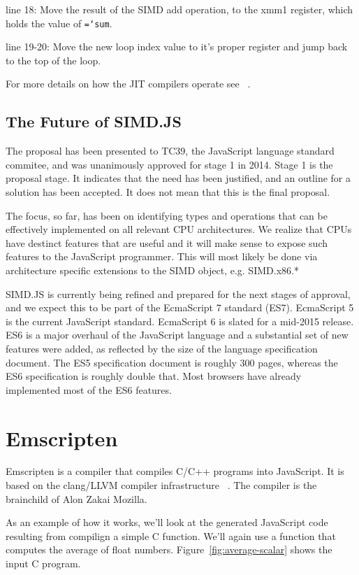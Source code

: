 \documentclass[preprint]{sigplanconf}
\newcommand{\ttt}[1]{{\texttt{\hyphenchar\font=`\-\relax #1}}}%
\begin{document}
line 18: Move the result of the SIMD add operation, to the xmm1 register, which
holds the value of \ttt{sum}.

line 19-20: Move the new loop index value to it's proper register and jump back
to the top of the loop.

For more details on how the JIT compilers operate see ~\cite{wpmvp2014}.

\subsection{The Future of SIMD.JS}

The proposal has been presented to TC39, the JavaScript language standard
commitee, and was unanimously approved for stage 1 in 2014.  Stage 1 is the
proposal stage.  It indicates that the need has been justified, and an 
outline for a solution has been accepted.  It does not mean that this is the final
proposal.

The focus, so far, has been on identifying types and operations that can be
effectively implemented on all relevant CPU architectures.  We realize that CPUs
have destinct features that are useful and it will make sense to expose such 
features to the JavaScript programmer.  This will most likely be done via
architecture specific extensions to the SIMD object, e.g. SIMD.x86.*

SIMD.JS is currently being refined and prepared for the next stages of approval,
and we expect this to be part of the EcmaScript 7 standard (ES7).
EcmaScript 5 is the current JavaScript standard.  EcmaScript 6 is slated for a
mid-2015 release. ES6 is a major overhaul of the JavaScript language and a 
substantial set of new features were added, as reflected by the size of the 
language specification document.  The ES5 specification document is roughly 300 
pages, whereas the ES6 specification is roughly double that. Most browsers 
have already implemented most of the ES6 features.

\section{Emscripten}

Emscripten is a compiler that compiles C/C++ programs into JavaScript.  It is
based on the clang/LLVM compiler infrastructure ~\cite{emscripten}.  The compiler
is the brainchild of Alon Zakai  Mozilla.

As an example of how it works, we'll look at the generated JavaScript code
resulting from compilign a simple C function.  We'll again use a function that
computes the average of float numbers.  Figure~\ref{fig:average-scalar} shows
the input C program.
\end{document}
